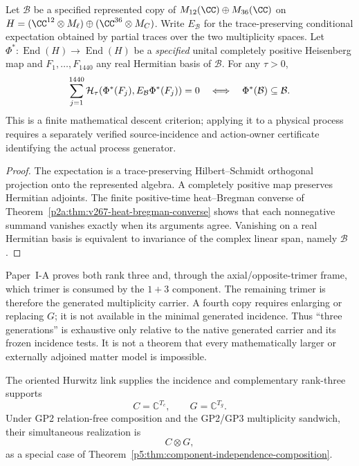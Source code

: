 \documentclass[12pt,a4paper]{article}
\begin{document}
\begin{proposition}
\label{p5:prop:v329-matter-process-descent}
Let $\mathcal B$ be a specified represented copy of
$M_{12}(\CC)\oplus M_{36}(\CC)$ on
$H=(\CC^{12}\otimes M_\ell)\oplus(\CC^{36}\otimes M_C)$.
Write $E_\mathcal B$ for the trace-preserving conditional expectation
obtained by partial traces over the two multiplicity spaces.
Let $\Phi^*:\operatorname{End}(H)\to\operatorname{End}(H)$ be a
\emph{specified} unital completely positive Heisenberg map and
$F_1,\ldots,F_{1440}$ any real Hermitian basis of $\mathcal B$.
For any $\tau>0$,
\[
 \sum_{j=1}^{1440}
 {\cal H}_\tau(\Phi^*(F_j),E_\mathcal B\Phi^*(F_j))=0
 \quad\Longleftrightarrow\quad \Phi^*(\mathcal B)\subseteq\mathcal B.
\]
This is a finite mathematical descent criterion; applying it to a
physical process requires a separately verified source-incidence and
action-owner certificate identifying the actual process generator.
\end{proposition}
\begin{proof}
The expectation is a trace-preserving Hilbert--Schmidt orthogonal
projection onto the represented algebra. A completely positive map
preserves Hermitian adjoints. The finite positive-time heat--Bregman
converse of Theorem~\ref{p2a:thm:v267-heat-bregman-converse}
shows that each nonnegative summand vanishes exactly when its
arguments agree. Vanishing on a real Hermitian basis is equivalent
to invariance of the complex linear span, namely $\mathcal B$.
\end{proof}




\begin{remark}
\label{p5:rem:finite-carrier-three-generations}
Paper~I-A proves both rank three and, through the axial/opposite-trimer frame,
which trimer is consumed by the \(1+3\) component.  The remaining trimer is
therefore the generated multiplicity carrier.  A fourth copy requires
enlarging or replacing \(G\); it is not available in the minimal generated
incidence.  Thus ``three generations'' is exhaustive only relative to the
native generated carrier and its frozen incidence tests.  It is not a
theorem that every mathematically larger or externally adjoined matter model
is impossible.
\end{remark}



\begin{theorem}
\label{p5:thm:canonical-color-family}
The oriented Hurwitz link supplies the incidence and complementary
rank-three supports
\[
C=\mathbb C^{T_c},
\qquad
G=\mathbb C^{T_g}.
\]
Under GP2 relation-free composition and the GP2/GP3 multiplicity sandwich,
their simultaneous realization
is
\[
C\otimes G,
\]
as a special case of Theorem~\ref{p5:thm:component-independence-composition}.
\end{theorem}
\end{document}
